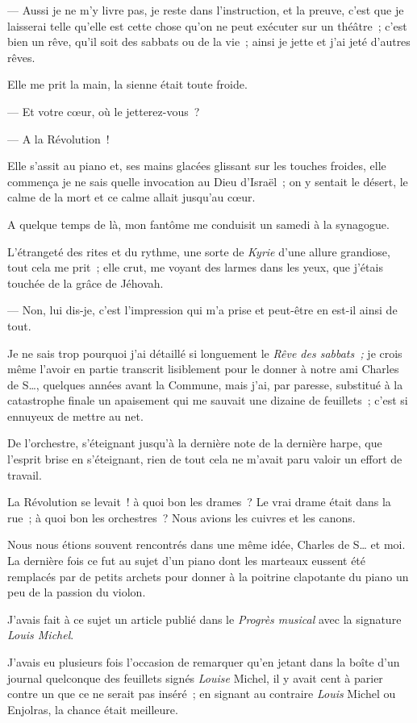 \documentclass[french,twoside]{book} %
\newcommand\chapterclose{} %
\begin{document}
— Aussi je ne m’y livre pas, je reste dans l’instruction, et la preuve, c’est que je laisserai telle qu’elle est cette chose qu’on ne peut exécuter sur un théâtre ; c’est bien un rêve, qu’il soit des sabbats ou de la vie ; ainsi je jette et j’ai jeté d’autres rêves.\par
Elle me prit la main, la sienne était toute froide.\par
— Et votre cœur, où le jetterez-vous ?\par
— A la Révolution !\par
Elle s’assit au piano et, ses mains glacées glissant sur les touches froides, elle commença je ne sais quelle invocation au Dieu d’Israël ; on y sentait le désert, le calme de la mort et ce calme allait jusqu’au cœur.\par
A quelque temps de là, mon fantôme me conduisit un samedi à la synagogue.\par
L’étrangeté des rites et du rythme, une sorte de \emph{Kyrie} d’une allure grandiose, tout cela me prit ; elle crut, me voyant des larmes dans les yeux, que j’étais touchée de la grâce de Jéhovah.\par
 — Non, lui dis-je, c’est l’impression qui m’a prise et peut-être en est-il ainsi de tout.\par
Je ne sais trop pourquoi j’ai détaillé si longuement le \emph{Rêve des sabbats ;} je crois même l’avoir en partie transcrit lisiblement pour le donner à notre ami Charles de S…, quelques années avant la Commune, mais j’ai, par paresse, substitué à la catastrophe finale un apaisement qui me sauvait une dizaine de feuillets ; c’est si ennuyeux de mettre au net.\par
De l’orchestre, s’éteignant jusqu’à la dernière note de la dernière harpe, que l’esprit brise en s’éteignant, rien de tout cela ne m’avait paru valoir un effort de travail.\par
La Révolution se levait ! à quoi bon les drames ? Le vrai drame était dans la rue ; à quoi bon les orchestres ? Nous avions les cuivres et les canons.\par
\bigbreak
\noindent Nous nous étions souvent rencontrés dans une même idée, Charles de S… et moi. La dernière fois ce fut au sujet d’un piano dont les marteaux eussent été remplacés par de petits archets pour donner à la poitrine clapotante du piano un peu de la passion du violon.\par
J’avais fait à ce sujet un article publié dans le \emph{Progrès musical} avec la signature \emph{Louis Michel}.\par
 J’avais eu plusieurs fois l’occasion de remarquer qu’en jetant dans la boîte d’un journal quelconque des feuillets signés \emph{Louise} Michel, il y avait cent à parier contre un que ce ne serait pas inséré ; en signant au contraire \emph{Louis} Michel ou Enjolras, la chance était meilleure.
\chapterclose
\end{document}
